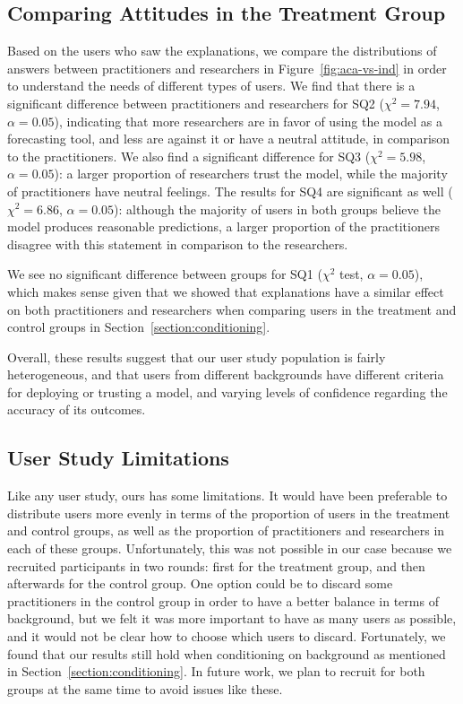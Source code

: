 \subsection{Comparing Attitudes in the Treatment Group}
Based on the users who saw the explanations, we compare the distributions of answers between practitioners and researchers in Figure~\ref{fig:aca-vs-ind} in order to understand the needs of different types of users. 
We find that there is a significant difference between practitioners and researchers for SQ2 ($\chi^{2} = 7.94$, $\alpha = 0.05$), indicating that more researchers are in favor of using the model as a forecasting tool, and less are against it or have a neutral attitude, in comparison to the practitioners. 
We also find a significant difference for SQ3 ($\chi^{2} = 5.98$, $\alpha = 0.05$): a larger proportion of researchers trust the model, while the majority of practitioners have neutral feelings. 
The results for SQ4 are significant as well ($\chi^{2} = 6.86$, $\alpha = 0.05$): 
although the majority of users in both groups believe the model produces reasonable predictions, a larger proportion of the practitioners disagree with this statement in comparison to the researchers. 

We see no significant difference between groups for SQ1 ($\chi^{2}$ test, $\alpha = 0.05$), which makes sense given that we showed that \OurMethod{} explanations have a similar effect on both practitioners and researchers when comparing users in the treatment and control groups in Section~\ref{section:conditioning}. 

Overall, these results suggest that our user study population is fairly heterogeneous, and that users from different backgrounds have different criteria for deploying or trusting a model, and varying levels of confidence regarding the accuracy of its outcomes. 


\subsection{User Study Limitations}
Like any user study, ours has some limitations. 
It would have been preferable to distribute users more evenly in terms of the proportion of users in the treatment and control groups, as well as the proportion of practitioners and researchers in each of these groups. 
Unfortunately, this was not possible in our case because we recruited participants in two rounds: first for the treatment group, and then afterwards for the control group. 
One option could be to discard some practitioners in the control group in order to have a better balance in terms of background, but we felt it was more important to have as many users as possible, and it would not be clear how to choose which users to discard. 
Fortunately, we found that our results still hold when conditioning on background as mentioned in Section~\ref{section:conditioning}. 
In future work, we plan to recruit for both groups at the same time to avoid issues like these. 

